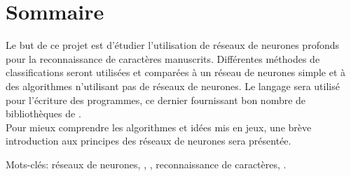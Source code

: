 
\chapter{Sommaire}

Le but de ce projet est d'étudier l'utilisation de réseaux de neurones 
profonds pour la reconnaissance de caractères manuscrits. 
Différentes méthodes de classifications seront utilisées et comparées à un réseau 
de neurones simple et à des algorithmes n'utilisant pas de réseaux de neurones.
Le langage \Python sera utilisé pour l'écriture des programmes, ce dernier 
fournissant bon nombre de bibliothèques de . \\
Pour mieux comprendre les algorithmes et idées mis en jeux, une brève 
introduction aux principes des réseaux de neurones sera présentée. 

\vspace{1cm}

Mots-clés: réseaux de neurones, , , reconnaissance de caractères, \Python.

\vfill
